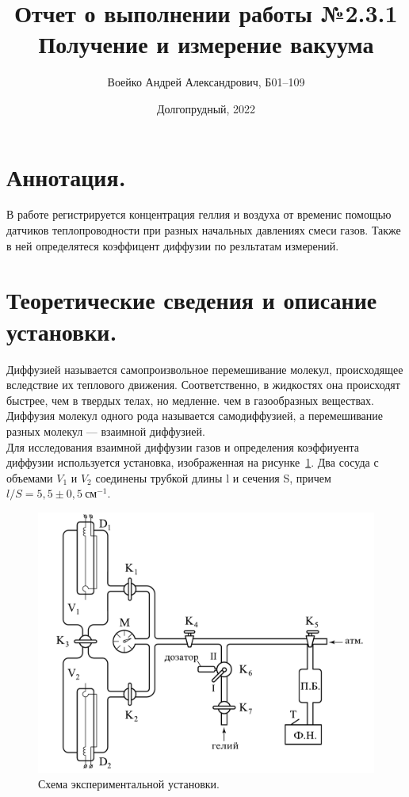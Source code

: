 \documentclass[a4paper,11pt]{article}
\title{Отчет о выполнении работы №2.3.1\\Получение и измерение вакуума}
\author{Воейко Андрей Александрович, Б01--109}
\date{Долгопрудный, 2022}
\begin{document}
\maketitle
\newpage
\section{Аннотация.}
В работе регистрируется концентрация геллия и воздуха от временис помощью датчиков теплопроводности при разных начальных давлениях смеси газов. Также в ней определятеся коэффицент диффузии по резльтатам измерений.
\section{Теоретические сведения и описание установки.}
Диффузией называется самопроизвольное перемешивание молекул, происходящее вследствие их теплового движения. Соответственно, в жидкостях она происходят быстрее, чем в твердых телах, но медленне. чем в газообразных веществах. Диффузия молекул одного рода называется самодиффузией, а перемешивание разных молекул --- взаимной диффузией.\\
Для исследования взаимной диффузии газов и определения коэффиуента диффузии используется установка, изображенная на рисунке~\ref{fig:img1}. Два сосуда с объемами $V_{1}$ и $V_{2}$ соединены трубкой длины l и сечения S, причем $l/S = 5,5 \pm 0,5\ см^{-1}$.\\
\begin{figure}\label{fig:img1}
  \includegraphics[scale = 0.273]{scheme1.png}
  \caption{Схема экспериментальной установки.}
\end{figure}
\end{document}
